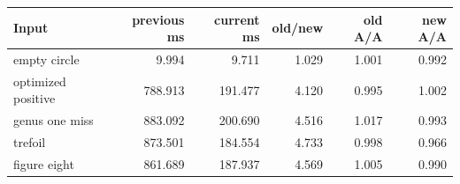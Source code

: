 \begin{center}
\small
\begin{tabular}{lrrrrr}
\toprule
Input & previous ms & current ms & old/new & old A/A & new A/A\\
\midrule
empty circle & 9.994 & 9.711 & 1.029 & 1.001 & 0.992\\
optimized positive & 788.913 & 191.477 & 4.120 & 0.995 & 1.002\\
genus one miss & 883.092 & 200.690 & 4.516 & 1.017 & 0.993\\
trefoil & 873.501 & 184.554 & 4.733 & 0.998 & 0.966\\
figure eight & 861.689 & 187.937 & 4.569 & 1.005 & 0.990\\
\bottomrule
\end{tabular}
\end{center}
